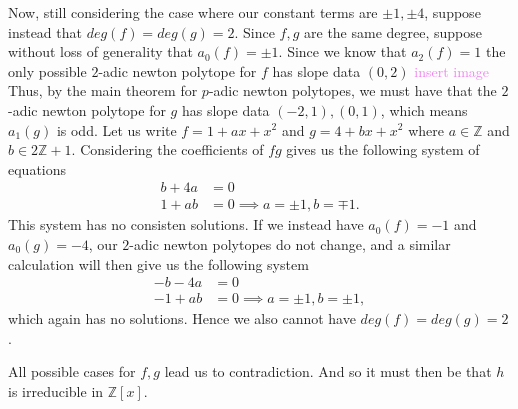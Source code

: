 \documentclass[12pt,letterpaper,boxed]{hmcpset}
\newcommand{\wg}[1]{\textcolor{violet}{#1}}
\newcommand{\Z}{\mathbb Z}
\begin{document}
\begin{solution}
\begin{itemize}
Now, still considering the case where our constant terms are $\pm 1,
\pm 4$, suppose instead that $deg(f) = deg(g) = 2$. Since $f,g$ are
the same degree, suppose without loss of generality that $a_0(f) = \pm
1$. Since we know that $a_2(f) = 1$ the only possible $2$-adic newton
polytope for $f$ has slope data $(0,2)$
\wg{insert image}
Thus, by the main theorem for $p$-adic newton polytopes, we must have
that the $2$-adic newton polytope for $g$ has slope data $(-2,1),
(0,1)$, which means $a_1(g)$ is odd.
Let us write $f = 1 + ax + x^2$ and $g = 4 + bx + x^2$ where $a \in
\Z$ and $b \in 2\Z + 1$. Considering the coefficients of $fg$ gives us
the following system of equations 
\begin{align*}
	b + 4a &= 0 \\
	1 + ab &= 0 \implies a = \pm 1, b = \mp 1.
\end{align*}
This system has no consisten solutions.
If we instead have $a_0(f) = -1$ and $a_0(g) = -4$, our $2$-adic
newton polytopes do not change, and a similar calculation will then
give us the following system
\begin{align*}
	-b -4a &= 0 \\
	-1 + ab &= 0 \implies a = \pm 1, b = \pm 1,
\end{align*}
which again has no solutions. Hence we also cannot have $deg(f) =
deg(g) = 2$. 

All possible cases for $f,g$ lead us to contradiction. And so it must
then be that $h$ is irreducible in $\Z[x]$. 



\end{itemize}
\end{solution}

\newpage


\begin{problem}[4]
	\hfill
\end{problem}

\begin{solution}
\end{solution}

\newpage
\end{document}
